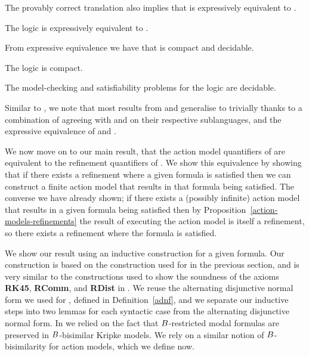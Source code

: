 The provably correct translation also implies that \logicRamlKFF{} is expressively equivalent to \logicKFF{}.

\begin{corollary}\label{raml-k45-expressive-equivalence}
The logic \logicRamlKFF{} is expressively equivalent to \logicKFF{}.
\end{corollary}

From expressive equivalence we have that \logicRmlKFF{} is compact and decidable.

\begin{corollary}
The logic \logicRamlKFF{} is compact.
\end{corollary}

\begin{corollary}
The model-checking and satisfiability problems for the logic \logicRamlKFF{} are decidable.
\end{corollary}

Similar to \logicRamlK{}, we note that most results from \logicAmlKFF{} and \logicRmlKFF{} generalise to \logicRamlKFF{} trivially thanks to a combination of \logicRamlKFF{} agreeing with \logicAmlKFF{} and \logicRmlKFF{} on their respective sublanguages, and the expressive equivalence of \logicRamlKFF{} and \logicKFF{}.

We now move on to our main result, that the action model quantifiers of \logicAamlK{} are equivalent to the refinement quantifiers of \logicRmlK{}.
We show this equivalence by showing that if there exists a refinement where a given formula is satisfied then we can construct a finite action model that results in that formula being satisfied.
The converse we have already shown; if there exists a (possibly infinite) action model that results in a given formula being satisfied then by Proposition~\ref{action-models-refinements} the result of executing the action model is itself a refinement, so there exists a refinement where the formula is satisfied.

We show our result using an inductive construction for a given formula.
Our construction is based on the construction used for \logicRamlK{} in the previous section, and is very similar to the constructions used to show the soundness of the axioms {\bf RK45}, {\bf RComm}, and {\bf RDist} in \logicRmlKFF{}.
We reuse the alternating disjunctive normal form we used for \logicRmlKFF{}, defined in Definition~\ref{adnf}, and we separate our inductive steps into two lemmas for each syntactic case from the alternating disjunctive normal form.
In \logicRmlKFF{} we relied on the fact that $B$-restricted modal formulas are preserved in $B$-bisimilar Kripke models.
We rely on a similar notion of $B$-bisimilarity for action models, which we define now.

